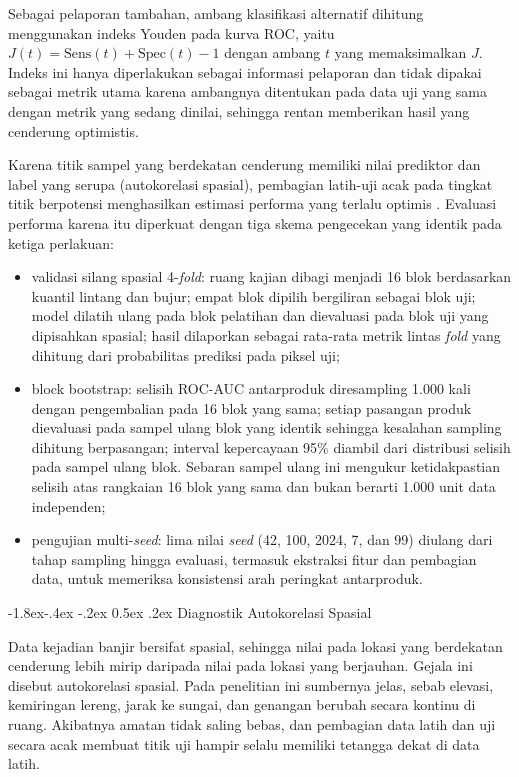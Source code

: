 \documentclass[12pt,a4paper]{article}
\makeatletter
\renewcommand\subsubsection{\@startsection{subsubsection}{3}{\z@}%
  {-1.8ex\@plus -.4ex \@minus -.2ex}%
  {0.5ex \@plus .2ex}%
  {\normalfont\normalsize\bfseries}}
\makeatother
\begin{document}
Sebagai pelaporan tambahan, ambang klasifikasi alternatif dihitung menggunakan
indeks Youden \citep{youden1950} pada kurva ROC, yaitu
$J(t)=\text{Sens}(t)+\text{Spec}(t)-1$ dengan ambang $t$ yang memaksimalkan
$J$. Indeks ini hanya diperlakukan sebagai informasi pelaporan dan tidak
dipakai sebagai metrik utama karena ambangnya ditentukan pada data uji yang
sama dengan metrik yang sedang dinilai, sehingga rentan memberikan hasil yang
cenderung optimistis.

Karena titik sampel yang berdekatan cenderung memiliki nilai prediktor dan
label yang serupa (autokorelasi spasial), pembagian latih-uji acak pada
tingkat titik berpotensi menghasilkan estimasi performa yang terlalu optimis
\citep{roberts2017,ploton2020}. Evaluasi performa karena itu diperkuat dengan
tiga skema pengecekan yang identik pada ketiga perlakuan:

\begin{itemize}
\item validasi silang spasial 4-\textit{fold}: ruang kajian dibagi
menjadi 16 blok berdasarkan kuantil lintang dan bujur; empat blok dipilih
bergiliran sebagai blok uji; model dilatih ulang pada blok pelatihan dan
dievaluasi pada blok uji yang dipisahkan spasial; hasil dilaporkan sebagai
rata-rata metrik lintas \textit{fold} yang dihitung dari probabilitas
prediksi pada piksel uji;
\item block bootstrap: selisih ROC-AUC antarproduk diresampling
1.000 kali dengan pengembalian pada 16 blok yang sama; setiap pasangan
produk dievaluasi pada sampel ulang blok yang identik sehingga kesalahan
sampling dihitung berpasangan; interval kepercayaan 95\% diambil dari
distribusi selisih pada sampel ulang blok. Sebaran sampel ulang ini mengukur
ketidakpastian selisih atas rangkaian 16 blok yang sama dan bukan berarti
1.000 unit data independen;
\item pengujian multi-\textit{seed}: lima nilai \textit{seed}
(42, 100, 2024, 7, dan 99) diulang dari tahap sampling hingga evaluasi,
termasuk ekstraksi fitur dan pembagian data, untuk memeriksa konsistensi
arah peringkat antarproduk.
\end{itemize}

\subsubsection{Diagnostik Autokorelasi Spasial}

Data kejadian banjir bersifat spasial, sehingga nilai pada lokasi yang
berdekatan cenderung lebih mirip daripada nilai pada lokasi yang berjauhan.
Gejala ini disebut autokorelasi spasial. Pada penelitian ini sumbernya jelas,
sebab elevasi, kemiringan lereng, jarak ke sungai, dan genangan berubah
secara kontinu di ruang. Akibatnya amatan tidak saling bebas, dan pembagian
data latih dan uji secara acak membuat titik uji hampir selalu memiliki
tetangga dekat di data latih.
\end{document}
